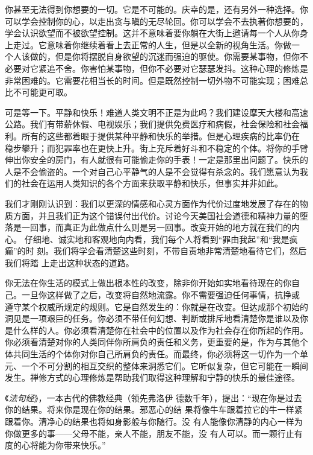 你甚至无法得到你想要的一切。它是不可能的。庆幸的是，还有另外一种选择。你
可以学会控制你的心，以走出贪与瞋的无尽轮回。你可以学会不去执著你想要的，
学会认识欲望而不被欲望控制。这并不意味着要你躺在大街上邀请每一个人从你身
上走过。它意味着你继续着看上去正常的人生，但是以全新的视角生活。你做\1一
个人该做的，但是你将摆脱自身欲望的沉迷而强迫的驱使。你需要某事物，但你不
必要对它紧追不舍。你害怕某事物，但你不必要对它瑟瑟发抖。这种心理的修炼是
非常困难的。它需要花相当长的时间。但是既然控制一切外物不可能实现；困难总
比不可能更可取。

可是等一下。平静和快乐！难道人类文明不正是为此吗？我们建设摩天大楼和高速
公路。我们有带薪休假、电视娱乐；我们提供免费医疗和病假，社会保险和社会福
利。所有的这些都着眼于提供某种平静和快乐的举措。但是心理疾病的比率仍在
稳步攀升；而犯罪率也在更快上升。街上充斥着好斗和不稳定的个体。将你的手臂
伸出你安全的房门，有人就很有可能偷走你的手表！一定是那里出问题了。快乐的
人是不会偷盗的。一个对自己心平静气的人是不会觉得有杀念的。我们愿意认为我
们的社会在运用人类知识的各个方面来获取平静和快乐，但事实并非如此。

我们才刚刚认识到：我们以更深的情感和心灵方面作为代价过度地发展了存在的物
质方面，并且我们正为这个错误付出代价。讨论今天美国社会道德和精神力量的堕
落是一回事，而真正为此做点什么则是另一回事。改变开始的地方就在我们的内心。
仔细地、诚实地和客观地向内看，我们每个人将看到“罪由我起”和“我是疯癫”的时
刻。我们将学会看清楚这些时刻，不带自责地非常清楚地看待它们，然后我们将踏
上走出这种状态的道路。

你无法在你生活的模式上做出根本性的改变，除非你开始如实地看待现在的你自
己。一旦你这样做了之后，\1改变将自然地流露。你不需要强迫任何事情，抗挣或
遵守某个权威所规定的规则。它是自然发生的：你就是在改变。但达成那个初始的
洞见是一项艰巨的任务。你必须不带任何幻想、判断或排斥地看清楚你是谁以及你
是什么样的人。你必须看清楚你在社会中的位置以及作为社会存在你所起的作用。
你必须看清楚对你的人类同伴你所肩负的责任和义务，更重要的是，作为与其他个
体共同生活的个体你对你自己所肩负的责任。而最终，你必须将这一切作为一个单
元、一个不可分割的相互交织的整体来洞悉它们。它听似复杂，但它可能在一瞬间
发生。禅修方式的心理修炼是帮助我们取得这种理解和宁静的快乐的最佳途径。

《{\it 法句经}》，一本古代的佛教经典（领先弗洛伊
德数千年），提出：“现在你是过去你的结果。将来你是现在你的结果。邪恶心的结
果将像牛车跟着拉它的牛一样紧跟着你。清净心的结果也将如身影般与你随行。没
有人能像你清静的内心一样为你做更多的事——父母不能，亲人不能，朋友不能，没
有人可以。而一颗行止有度的心将能为你带来快乐。”

